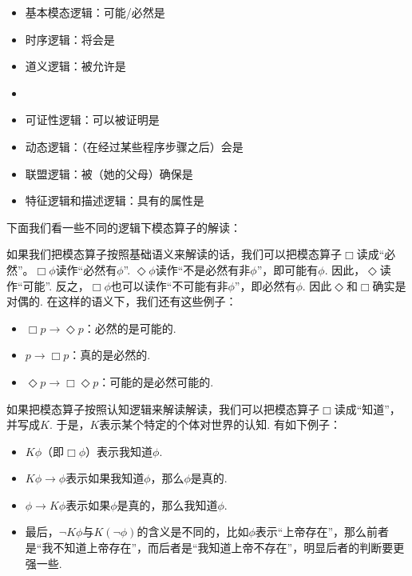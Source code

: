 \begin{itemize}
    \item {}基本模态逻辑：可能/必然是
    \item {}时序逻辑：将会是
    \item {}道义逻辑：被允许是
    \item {}
    \item {}可证性逻辑：可以被证明是
    \item {}动态逻辑：（在经过某些程序步骤之后）会是
    \item {}联盟逻辑：被（她的父母）确保是
    \item {}特征逻辑和描述逻辑：具有的属性是
\end{itemize}

下面我们看一些不同的逻辑下模态算子的解读：

\begin{example}[基础语义]
如果我们把模态算子按照基础语义来解读的话，我们可以把模态算子$\Box$读成“必然”。$\Box\phi$读作“必然有$\phi$”. $\Diamond\phi$读作“不是必然有非$\phi$”，即可能有$\phi$. 因此，$\Diamond$读作“可能”. 反之，$\Box\phi$也可以读作“不可能有非$\phi$”，即必然有$\phi$. 因此$\Diamond$和$\Box$确实是对偶的. 在这样的语义下，我们还有这些例子：
\begin{itemize}
    \item $\Box p\to\Diamond p$：必然的是可能的.
    \item $p\to\Box p$：真的是必然的.
    \item $\Diamond p\to\Box\Diamond p$：可能的是必然可能的.
\end{itemize}
\end{example}

\begin{example}[认知语义]
    如果把模态算子按照认知逻辑来解读解读，我们可以把模态算子$\Box$读成“知道”，并写成$K$. 于是，$K$表示某个特定的个体对世界的认知. 有如下例子：
    \begin{itemize}
        \item $K\phi$（即$\Box\phi$）表示我知道$\phi$. 
        \item $K\phi\to\phi$表示如果我知道$\phi$，那么$\phi$是真的. 
        \item $\phi\to K\phi$表示如果$\phi$是真的，那么我知道$\phi$. 
        \item 最后，$\neg K\phi$与$K(\neg\phi)$的含义是不同的，比如$\phi$表示“上帝存在”，那么前者是“我不知道上帝存在”，而后者是“我知道上帝不存在”，明显后者的判断要更强一些.
\end{itemize}
\end{example}

